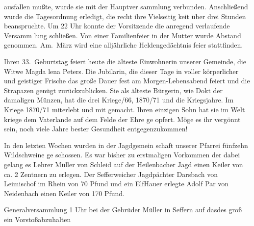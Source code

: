 

ausfallen mußte, wurde sie mit der Hauptver\ohb
sammlung verbunden. Anschließend wurde die\ob
Tagesordnung erledigt, die recht ihre Vielseitig keit\ob
über drei Stunden beanspruchte. Um 22 Uhr konnte\ob
der Vorsitzende die anregend verlaufende Versamm\ohb
lung schließen. Von einer Familienfeier in der\ob
\unsicher Mutter wurde Abstand genommen. Am.\ März wird eine alljährliche Heldengedächtnis\ohb
feier stattfinden.

%
Ihren 33.\ Geburtstag feiert heute die älteste\ob
Einwohnerin unserer Gemeinde, die Witwe Magda\ohb
lena Peters. Die Jubilarin, die dieser Tage in voller\ob
körperlicher und geistiger Frische das große Dauer\ohb
fest am Morgen-Lebensabend feiert und die Strapazen\ob
genügt zurückzublicken. Sie als älteste Bürgerin, wie Dokt\ohb
\unsicher der damaligen Münzen, hat die drei Kriege/66, 1870/71 und die Kriegsjahre. Im Kriege 1870/71 miterlebt und mit\ohb
gemacht. Ihren einzigen Sohn hat sie im Welt\ohb
kriege dem Vaterlande auf dem Felde der Ehre ge\ohb
opfert. Möge es ihr vergönnt sein, noch viele Jahre\ob
bester Gesundheit entgegenzukommen!

%
In den letzten Wochen wurden in der Jagdgemein\ohb
schaft unserer Pfarrei fünfzehn Wildschweine ge\ohb
schossen. Es war bisher zu erstmaligen Vorkommen der\ob
dabei gelang es Lehrer Müller von Schleid auf der\ob
Heilenbacher Jagd einen Keiler von ca. 2 Zentnern\ob
zu erlegen. Der Sefferweicher Jagdpächter\unsicher{} Darsbach\ob
\unsicher von Leimischof im Rhein von 70 Pfund\ob
und ein Elf\unsicher Hauer erlegte Adolf\unsicher{} Par\ob
von Neidenbach einen Keiler von 170 Pfund.

%
Generalversammlung\unsicher{} 1 Uhr bei\unsicher{} der Gebrüder\unsicher\ob
Müller in Seffern\unsicher{} auf das\unsicher{}\unsicher des\unsicher\ob
groß\unsicher{} ein Vorstoß\unsicher abzuhalten\unsicher
\pend

